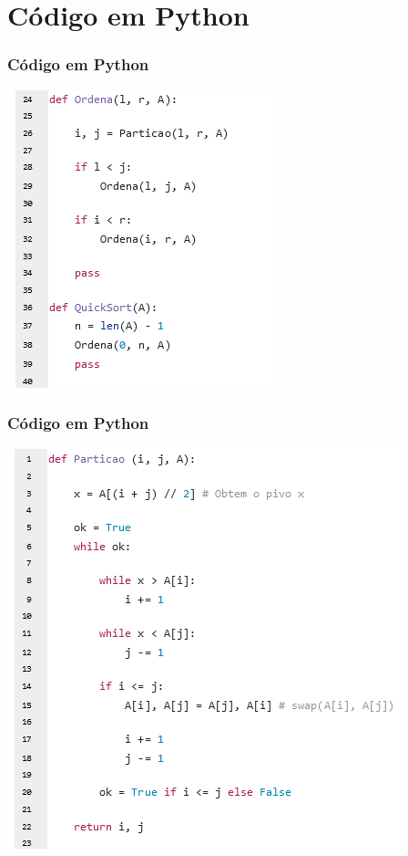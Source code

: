\documentclass[
	11pt, %
]{beamer}
\begin{document}
\section{Código em Python}
\begin{frame}
	\frametitle{Código em Python}
	\includegraphics[width=0.6\linewidth]{quick_sort_in_python_ordena}
\end{frame}

\begin{frame}
	\frametitle{Código em Python}
	\includegraphics[width=0.7\linewidth]{quick_sort_in_python_particao}
\end{frame}
\end{document}
